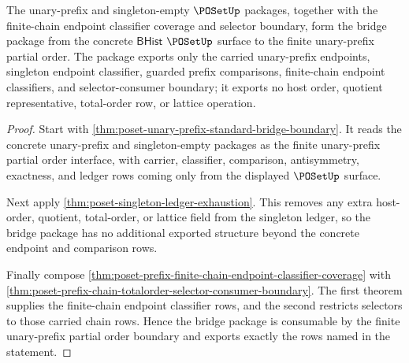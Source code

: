 \begin{theorem}
\label{thm:poset-unary-prefix-bridged-closure-package}
The unary-prefix and singleton-empty $\POSetUp$ packages, together with the
finite-chain endpoint classifier coverage and selector boundary, form the
bridge package from the concrete $\mathsf{BHist}$ $\POSetUp$ surface to the
finite unary-prefix partial order. The package exports only the carried
unary-prefix endpoints, singleton endpoint classifier, guarded prefix
comparisons, finite-chain endpoint classifiers, and selector-consumer boundary;
it exports no host order, quotient representative, total-order row, or lattice
operation.
\end{theorem}
\begin{proof}
Start with \autoref{thm:poset-unary-prefix-standard-bridge-boundary}. It reads
the concrete unary-prefix and singleton-empty packages as the finite
unary-prefix partial order interface, with carrier, classifier, comparison,
antisymmetry, exactness, and ledger rows coming only from the displayed
$\POSetUp$ surface.

Next apply \autoref{thm:poset-singleton-ledger-exhaustion}. This removes any
extra host-order, quotient, total-order, or lattice field from the singleton
ledger, so the bridge package has no additional exported structure beyond the
concrete endpoint and comparison rows.

Finally compose
\autoref{thm:poset-prefix-finite-chain-endpoint-classifier-coverage} with
\autoref{thm:poset-prefix-chain-totalorder-selector-consumer-boundary}. The
first theorem supplies the finite-chain endpoint classifier rows, and the
second restricts selectors to those carried chain rows. Hence the bridge
package is consumable by the finite unary-prefix partial order boundary and
exports exactly the rows named in the statement.
\end{proof}

